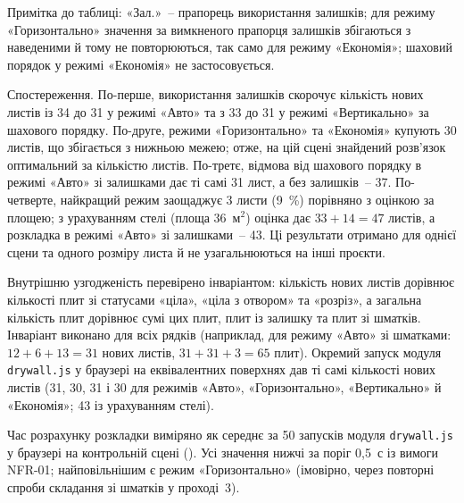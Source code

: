 Примітка до таблиці: «Зал.»~-- прапорець використання залишків; для режиму «Горизонтально» значення за вимкненого прапорця залишків збігаються з наведеними й тому не повторюються, так само для режиму «Економія»; шаховий порядок у режимі «Економія» не застосовується.

Спостереження. По-перше, використання залишків скорочує кількість нових листів із 34 до 31 у режимі «Авто» та з 33 до 31 у режимі «Вертикально» за шахового порядку. По-друге, режими «Горизонтально» та «Економія» купують 30 листів, що збігається з нижньою межею; отже, на цій сцені знайдений розв'язок оптимальний за кількістю листів. По-третє, відмова від шахового порядку в режимі «Авто» зі залишками дає ті самі 31 лист, а без залишків~-- 37. По-четверте, найкращий режим заощаджує 3 листи (9~\%) порівняно з оцінкою за площею; з урахуванням стелі (площа 36~м$^2$) оцінка дає $33+14=47$ листів, а розкладка в режимі «Авто» зі залишками~-- 43. Ці результати отримано для однієї сцени та одного розміру листа й не узагальнюються на інші проєкти.

Внутрішню узгодженість перевірено інваріантом: кількість нових листів дорівнює кількості плит зі статусами «ціла», «ціла з отвором» та «розріз», а загальна кількість плит дорівнює сумі цих плит, плит із залишку та плит зі шматків. Інваріант виконано для всіх рядків  (наприклад, для режиму «Авто» зі шматками: $12+6+13=31$ нових листів, $31+31+3=65$ плит). Окремий запуск модуля \texttt{drywall.js} у браузері на еквівалентних поверхнях дав ті самі кількості нових листів (31, 30, 31 і 30 для режимів «Авто», «Горизонтально», «Вертикально» й «Економія»; 43 із урахуванням стелі).


Час розрахунку розкладки виміряно як середнє за 50 запусків модуля \texttt{drywall.js} у браузері на контрольній сцені (). Усі значення нижчі за поріг 0,5~с із вимоги NFR-01; найповільнішим є режим «Горизонтально» (імовірно, через повторні спроби складання зі шматків у проході~3).

